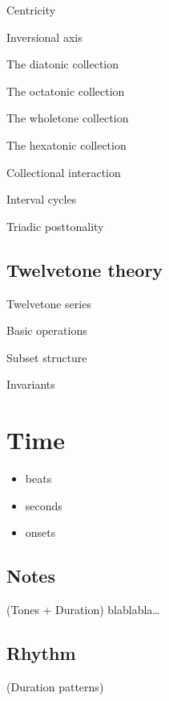 \documentclass[letterpaper,10pt,english]{sphinxmanual}
\begin{document}
\sphinxAtStartPar
Centricity

\sphinxAtStartPar
Inversional axis

\sphinxAtStartPar
The diatonic collection

\sphinxAtStartPar
The octatonic collection

\sphinxAtStartPar
The whole\sphinxhyphen{}tone collection

\sphinxAtStartPar
The hexatonic collection

\sphinxAtStartPar
Collectional interaction

\sphinxAtStartPar
Interval cycles

\sphinxAtStartPar
Triadic post\sphinxhyphen{}tonality


\section{Twelve\sphinxhyphen{}tone theory}
\label{\detokenize{3_set_theory:twelve-tone-theory}}
\sphinxAtStartPar
Twelve\sphinxhyphen{}tone series

\sphinxAtStartPar
Basic operations

\sphinxAtStartPar
Subset structure

\sphinxAtStartPar
Invariants


\chapter{Time}
\label{\detokenize{4_time:time}}\label{\detokenize{4_time:id1}}\label{\detokenize{4_time::doc}}\begin{itemize}
\item {} 
\sphinxAtStartPar
beats

\item {} 
\sphinxAtStartPar
seconds

\item {} 
\sphinxAtStartPar
onsets

\end{itemize}


\section{Notes}
\label{\detokenize{4_time:notes}}
\sphinxAtStartPar
(Tones + Duration)
blablabla…


\section{Rhythm}
\label{\detokenize{4_time:rhythm}}
\sphinxAtStartPar
(Duration patterns)
\end{document}
